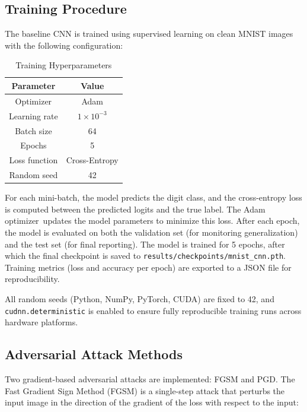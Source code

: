 \documentclass[conference]{IEEEtran}
\begin{document}
\subsection{Training Procedure}

The baseline CNN is trained using supervised learning on clean MNIST images with the following configuration:

\begin{table}[htbp]
\caption{Training Hyperparameters}
\begin{center}
\begin{tabular}{|c|c|}
\hline
\textbf{Parameter} & \textbf{Value} \\
\hline
Optimizer & Adam \\
\hline
Learning rate & $1 \times 10^{-3}$ \\
\hline
Batch size & 64 \\
\hline
Epochs & 5 \\
\hline
Loss function & Cross-Entropy \\
\hline
Random seed & 42 \\
\hline
\end{tabular}
\label{tab:hyperparams}
\end{center}
\end{table}

For each mini-batch, the model predicts the digit class, and the cross-entropy loss is computed between the predicted logits and the true label. The Adam optimizer~updates the model parameters to minimize this loss. After each epoch, the model is evaluated on both the validation set (for monitoring generalization) and the test set (for final reporting). The model is trained for 5 epochs, after which the final checkpoint is saved to \texttt{results/checkpoints/mnist\_cnn.pth}. Training metrics (loss and accuracy per epoch) are exported to a JSON file for reproducibility.

All random seeds (Python, NumPy, PyTorch, CUDA) are fixed to 42, and \texttt{cudnn.deterministic} is enabled to ensure fully reproducible training runs across hardware platforms.

\subsection{Adversarial Attack Methods}

Two gradient-based adversarial attacks are implemented: FGSM and PGD. The Fast Gradient Sign Method (FGSM) is a single-step attack that perturbs the input image in the direction of the gradient of the loss with respect to the input:
\end{document}
